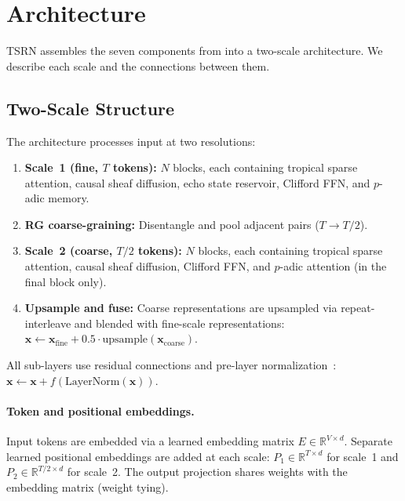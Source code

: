 \documentclass[11pt,a4paper]{article}
\newcommand{\R}{\mathbb{R}}
\begin{document}
\section{Architecture}
\label{sec:arch}

TSRN assembles the seven components from  into a
two-scale architecture.  We describe each scale and the connections
between them.

\subsection{Two-Scale Structure}
\label{sec:twoscale}

The architecture processes input at two resolutions:

\begin{enumerate}[leftmargin=*,nosep]
\item \textbf{Scale~1 (fine, $T$ tokens):} $N$ blocks, each
  containing tropical sparse attention, causal sheaf diffusion,
  echo state reservoir, Clifford FFN, and $p$-adic memory.
\item \textbf{RG coarse-graining:} Disentangle and pool adjacent
  pairs ($T \to T/2$).
\item \textbf{Scale~2 (coarse, $T/2$ tokens):} $N$ blocks, each
  containing tropical sparse attention, causal sheaf diffusion,
  Clifford FFN, and $p$-adic attention (in the final block only).
\item \textbf{Upsample and fuse:} Coarse representations are
  upsampled via repeat-interleave and blended with fine-scale
  representations: $\bm{x} \leftarrow \bm{x}_{\text{fine}} +
  0.5 \cdot \text{upsample}(\bm{x}_{\text{coarse}})$.
\end{enumerate}

All sub-layers use residual connections and pre-layer
normalization~\citep{ba2016layer}:
$\bm{x} \leftarrow \bm{x} + f(\text{LayerNorm}(\bm{x}))$.

\paragraph{Token and positional embeddings.}
Input tokens are embedded via a learned embedding matrix
$E \in \R^{V \times d}$.  Separate learned positional embeddings are
added at each scale: $P_1 \in \R^{T \times d}$ for scale~1 and
$P_2 \in \R^{T/2 \times d}$ for scale~2.  The output projection
shares weights with the embedding matrix (weight tying).
\end{document}
